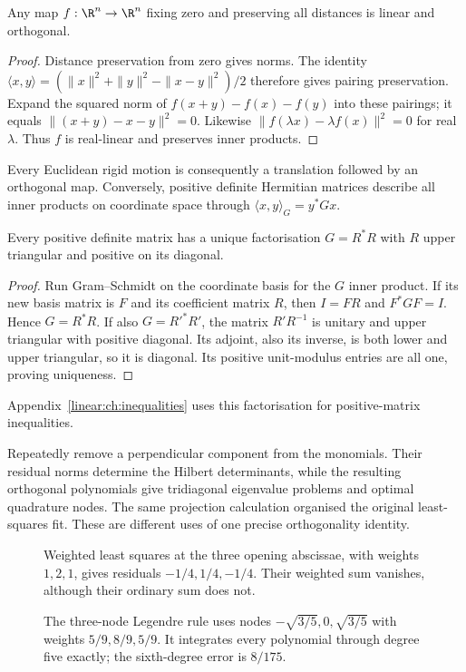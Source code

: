 \begin{theorem}\label{linear:thm:isometry}
Any map $f:\R^n\to\R^n$ fixing zero and preserving all distances is linear and orthogonal.
\end{theorem}
\begin{proof}
Distance preservation from zero gives norms. The identity $\langle x,y\rangle=(\|x\|^2+\|y\|^2-\|x-y\|^2)/2$ therefore gives pairing preservation. Expand the squared norm of $f(x+y)-f(x)-f(y)$ into these pairings; it equals $\|(x+y)-x-y\|^2=0$. Likewise $\|f(\lambda x)-\lambda f(x)\|^2=0$ for real $\lambda$. Thus $f$ is real-linear and preserves inner products.
\end{proof}

Every Euclidean rigid motion is consequently a translation followed by an orthogonal map. Conversely, positive definite Hermitian matrices describe all inner products on coordinate space through $\langle x,y\rangle_G=y^*Gx$.

\begin{corollary}\label{linear:cor:cholesky}
Every positive definite matrix has a unique factorisation $G=R^*R$ with $R$ upper triangular and positive on its diagonal.
\end{corollary}
\begin{proof}
Run Gram--Schmidt on the coordinate basis for the $G$ inner product. If its new basis matrix is $F$ and its coefficient matrix $R$, then $I=FR$ and $F^*GF=I$. Hence $G=R^*R$. If also $G=R'^*R'$, the matrix $R'R^{-1}$ is unitary and upper triangular with positive diagonal. Its adjoint, also its inverse, is both lower and upper triangular, so it is diagonal. Its positive unit-modulus entries are all one, proving uniqueness.
\end{proof}

Appendix~\ref{linear:ch:inequalities} uses this factorisation for positive-matrix inequalities.

\begin{beauty}
Repeatedly remove a perpendicular component from the monomials. Their residual norms determine the Hilbert determinants, while the resulting orthogonal polynomials give tridiagonal eigenvalue problems and optimal quadrature nodes. The same projection calculation organised the original least-squares fit. These are different uses of one precise orthogonality identity.
\end{beauty}

\begin{figure}[ht]
\centering{}
\caption{Weighted least squares at the three opening abscissae, with weights $1,2,1$, gives residuals $-1/4,1/4,-1/4$. Their weighted sum vanishes, although their ordinary sum does not.}
\label{fig:v8appDweights}
\end{figure}
\begin{figure}[ht]
\centering{}
\caption{The three-node Legendre rule uses nodes $-\sqrt{3/5},0,\sqrt{3/5}$ with weights $5/9,8/9,5/9$. It integrates every polynomial through degree five exactly; the sixth-degree error is $8/175$.}
\label{fig:v8appDgauss}
\end{figure}
